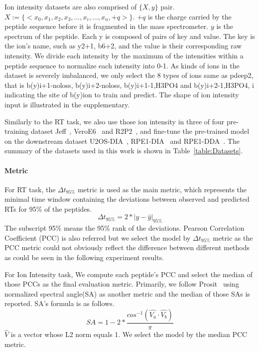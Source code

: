 Ion intensity datasets are also comprised of \( \{X, y\} \) pair. 
$X := \{ <x_0, x_1, x_2, x_3,\dots, x_i, \dots, x_n, +q> \}$. $+q$
is the charge carried by the peptide sequence before it is fragmented in the mass spectrometer. \( y \) is the spectrum of the peptide. Each y is composed of pairs of key and value.
The key is the ion's name, such as y2+1, b6+2, and the value is their corresponding raw intensity.
We divide each intensity by the maximum of the intensities within a peptide sequence to normalize each intensity into 0-1. As kinds of ions in the dataset is severely imbalanced, we only select the 8 types of ions same as pdeep2, that is b(y)i+1-noloss, b(y)i+2-noloss, b(y)i+1-1,H3PO4 and b(y)i+2-1,H3PO4, i indicating the site of b(y)ion to train and predict. The shape of ion intensity input is illustrated in the supplementary.

Similarly to the RT task, we also use those ion intensity in three of four pre-training dataset Jeff~\cite{liu2018vivo}, VeroE6~\cite{bouhaddou2020global} and R2P2~\cite{leutert2019r2}, and fine-tune the pre-trained model on the downstream dataset U2OS-DIA~\cite{wang2020naguider}, RPE1-DIA~\cite{bekker2020rapid} and RPE1-DDA~\cite{bekker2020rapid}. The summary of the datasets used in this work is shown in Table~\ref{table:Datasets}.
\paragraph*{Metric} For RT task, the $\Delta$$t_{95\%}$ metric is used as the main metric, which represents the minimal time window containing the deviations between observed and predicted RTs for 95\% of the peptides.
\[ \Delta t_{95\%} = 2 * | y - \hat{y} |_{95\%} \]
The subscript 95\% means the 95\% rank of the deviations.
Pearson Correlation Coefficient (PCC) is also referred but we select the model by $\Delta$$t_{95\%}$ metric as the PCC metric could not obviously reflect the difference between different methods as could be seen in the following experiment results.

For Ion Intensity task, We compute each peptide's PCC and select the median of those PCCs as the final evaluation metric. Primarily, we follow Prosit~\cite{gessulat2019prosit} using normalized
spectral angle(SA) as another metric and the median of those SAs is reported.
SA's formula is as follows.
\[ SA = 1 - 2 * \frac{cos^{-1}(\hat{V_a}\cdot\hat{V_b})}{\pi} \]
$\hat{V}$ is a vector whose L2 norm equals 1. We select the model by the median PCC metric.

